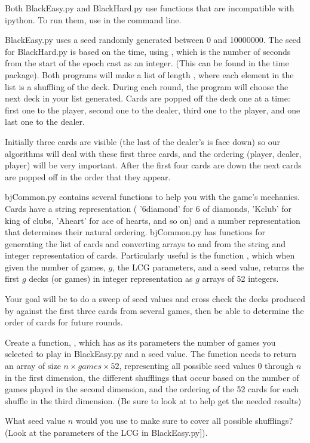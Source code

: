 \begin{warn}
Both BlackEasy.py and BlackHard.py use functions that are incompatible with ipython.
To run them, use  in the command line.
\end{warn}

BlackEasy.py uses a seed randomly generated between 0 and 10000000.
The seed for BlackHard.py is based on the time, using , which is the number of seconds from the start of the epoch cast as an integer.
(This can be found in the time package).
Both programs will make a list of length , where each element in the list is a shuffling of the deck.
During each round, the program will choose the next deck in your list generated.
Cards are popped off the deck one at a time: first one to the player, second one to the dealer, third one to the player, and one last one to the dealer. 

Initially three cards are visible (the last of the dealer's is face down) so our algorithms will deal with these first three cards, and the ordering (player, dealer, player) will be very important. 
After the first four cards are down the next cards are popped off in the order that they appear. 

bjCommon.py contains several functions to help you with the game's mechanics.
Cards have a string representation ( '6diamond' for 6 of diamonds, 'Kclub' for king of clubs, 'Aheart' for ace of hearts, and so on) and a number representation that determines their natural ordering. 
bjCommon.py has functions for generating the list of cards and converting arrays to and from the string and integer representation of cards. 
Particularly useful is the function , which when given the number of games, $g$, the LCG parameters, and a seed value, returns the first $g$ decks (or games) in integer representation as $g$ arrays of 52 integers.

Your goal will be to do a sweep of seed values and cross check the decks produced by  against the first three cards from several games, then be able to determine the order of cards for future rounds.


\begin{problem}\label{sweeps}

Create a function, , which has as its parameters the number of games you selected to play in BlackEasy.py and a seed value.
The function needs to return an array of size $n\times games \times 52$, representing all possible seed values 0 through $n$ in the first dimension, the different shufflings that occur based on the number of games played in the second dimension, and the ordering of the 52 cards for each shuffle in the third dimension.
(Be sure to look at  to help get the needed results)

What seed value $n$ would you use to make sure to cover all possible shufflings?
(Look at the parameters of the LCG in BlackEasy.py]).

\end{problem}

